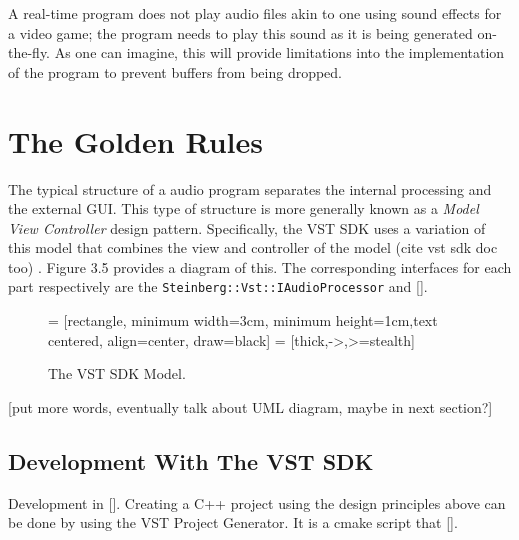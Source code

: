 A real-time program does not play audio files akin to one using sound effects for a video game; the program needs to play this sound as it is being generated on-the-fly. As one can imagine, this will provide limitations into the implementation of the program to prevent buffers from being dropped.

\section{The Golden Rules}
The typical structure of a audio program separates the internal processing and the external GUI. This type of structure is more generally known as a \textit{Model View Controller} design pattern. Specifically, the VST SDK uses a variation of this model that combines the view and controller of the model (cite vst sdk doc too) \cite{Bucanek2009}. Figure 3.5 provides a diagram of this. The corresponding interfaces for each part respectively are the \verb|Steinberg::Vst::IAudioProcessor|  and [].

\begin{figure}[h] %
	 = [rectangle, minimum width=3cm, minimum height=1cm,text centered, align=center, draw=black]
	 = [thick,->,>=stealth]
	\begin{center}
		\caption{The VST SDK Model.}
	\end{center}
\end{figure}

[put more words, eventually talk about UML diagram, maybe in next section?]

\subsection{Development With The VST SDK}
Development in []. Creating a C++ project using the design principles above can be done by using the VST Project Generator. It is a cmake script that [].


